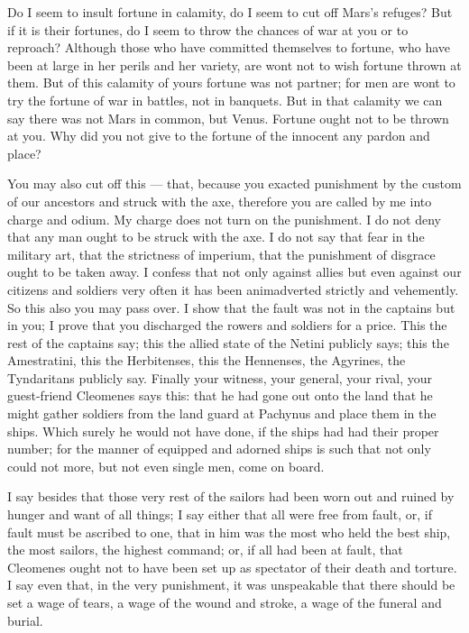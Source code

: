  Do I seem to insult fortune in calamity, do I seem to cut off Mars's refuges? But if it is their fortunes, do I seem to throw the chances of war at you or to reproach? Although those who have committed themselves to fortune, who have been at large in her perils and her variety, are wont not to wish fortune thrown at them. But of this calamity of yours fortune was not partner; for men are wont to try the fortune of war in battles, not in banquets. But in that calamity we can say there was not Mars in common, but Venus. Fortune ought not to be thrown at you. Why did you not give to the fortune of the innocent any pardon and place?

 You may also cut off this --- that, because you exacted punishment by the custom of our ancestors and struck with the axe, therefore you are called by me into charge and odium. My charge does not turn on the punishment. I do not deny that any man ought to be struck with the axe. I do not say that fear in the military art, that the strictness of imperium, that the punishment of disgrace ought to be taken away. I confess that not only against allies but even against our citizens and soldiers very often it has been animadverted strictly and vehemently. So this also you may pass over. I show that the fault was not in the captains but in you; I prove that you discharged the rowers and soldiers for a price. This the rest of the captains say; this the allied state of the Netini publicly says; this the Amestratini, this the Herbitenses, this the Hennenses, the Agyrines, the Tyndaritans publicly say. Finally your witness, your general, your rival, your guest-friend Cleomenes says this: that he had gone out onto the land that he might gather soldiers from the land guard at Pachynus and place them in the ships. Which surely he would not have done, if the ships had had their proper number; for the manner of equipped and adorned ships is such that not only could not more, but not even single men, come on board.

 I say besides that those very rest of the sailors had been worn out and ruined by hunger and want of all things; I say either that all were free from fault, or, if fault must be ascribed to one, that in him was the most who held the best ship, the most sailors, the highest command; or, if all had been at fault, that Cleomenes ought not to have been set up as spectator of their death and torture. I say even that, in the very punishment, it was unspeakable that there should be set a wage of tears, a wage of the wound and stroke, a wage of the funeral and burial.

